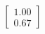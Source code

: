 \documentclass[preview]{standalone}
\begin{document}
\begin{align*}
\begin{bmatrix} 1.00 \\ 0.67 \end{bmatrix}
\end{align*}
\end{document}
